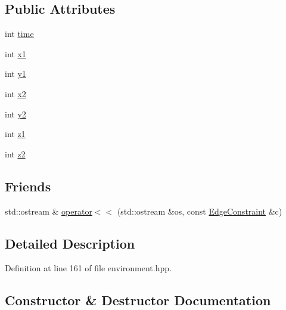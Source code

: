 \subsection*{Public Attributes}
\begin{DoxyCompactItemize}
\item 
int \hyperlink{structlib_multi_robot_planning_1_1_edge_constraint_a8bd6fcef2fd4363eeadc745cc4e86856}{time}
\item 
int \hyperlink{structlib_multi_robot_planning_1_1_edge_constraint_a295a57c0bb1d28adcedbb1c7e3ef15d5}{x1}
\item 
int \hyperlink{structlib_multi_robot_planning_1_1_edge_constraint_afba78e3bb5f1871ab6ca9f9928d27a14}{y1}
\item 
int \hyperlink{structlib_multi_robot_planning_1_1_edge_constraint_a332ed5352c22e7f359391381f55be3fa}{x2}
\item 
int \hyperlink{structlib_multi_robot_planning_1_1_edge_constraint_a3adb69f16ba037b5c45491d757e7456c}{y2}
\item 
int \hyperlink{structlib_multi_robot_planning_1_1_edge_constraint_a3a036db6b350499c79043df2b42dc709}{z1}
\item 
int \hyperlink{structlib_multi_robot_planning_1_1_edge_constraint_aff60d0e728647f8d80dcd6925f0e3f58}{z2}
\end{DoxyCompactItemize}
\subsection*{Friends}
\begin{DoxyCompactItemize}
\item 
std\+::ostream \& \hyperlink{structlib_multi_robot_planning_1_1_edge_constraint_a94c3e6e61fef6fe98974b7bcf1b2245e}{operator$<$$<$} (std\+::ostream \&os, const \hyperlink{structlib_multi_robot_planning_1_1_edge_constraint}{Edge\+Constraint} \&c)
\end{DoxyCompactItemize}


\subsection{Detailed Description}


Definition at line 161 of file environment.\+hpp.



\subsection{Constructor \& Destructor Documentation}
\mbox{\label{structlib_multi_robot_planning_1_1_edge_constraint_a99e91352e19b17233c6b61d349d0b19c}} 
